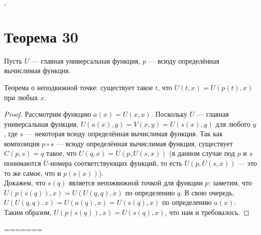 \documentclass[a4paper,12pt]{article}
\begin{document}
    \sep
    \section {Теорема 30}
    {
        \noindent
        Пусть $U$ --- главная универсальная функция, $p$ --- всюду определённая вычислимая функция.
    }
    \begin{theorem}
        Теорема о неподвижной точке: существует такое $t$, что $U(t, x)=U(p(t), x)$ при любых $x$.
    \end{theorem}
    \begin{proof}
        Рассмотрим функцию $a(x) = U(x, x)$. Поскольку $U$ --- главная универсальная функция, $U(a(x), y)=V(x, y)=U(s(x), y)$ для любого $y$, где $s$ --- некоторая всюду определённая вычислимая функция.
        Так как композиция $p \circ s$ --- всюду определённая вычислимая функция, существует $C(p, s) = q$ такое, что $U(q, x)=U(p, U(s, x))$ (в данном случае под $p$ и $s$ понимаются $U$-номера соответствующих функций, то есть $U(p, U(s, x))$ --- это то же самое, что и $p(s(x))$).\\
        Докажем, что $s(q)$ является непожвижной точкой для функции $p$: заметим, что $U(p(s(q)), x)=U(U(q, q), x)$ по определению $q$. В свою очередь, $U(U(q, q), x)=U(a(q), x)=U(s(q), x)$ по определению $a(x)$. Таким образом, $U(p(s(q)), x)=U(s(q), x)$, что нам и требовалось.
    \end{proof}
    
    
=======
	
\end{document}
